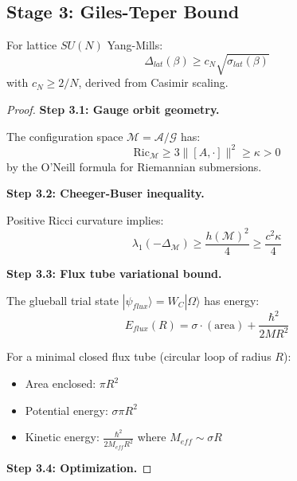 \subsection{Stage 3: Giles-Teper Bound}

\begin{theorem}
\label{thm:giles-teper-synthesis}
For lattice $SU(N)$ Yang-Mills:
\begin{equation}
\Delta_{lat}(\beta) \geq c_N \sqrt{\sigma_{lat}(\beta)}
\end{equation}
with $c_N \geq 2/N$, derived from Casimir scaling.
\end{theorem}

\begin{proof}
\textbf{Step 3.1: Gauge orbit geometry.}

The configuration space $\mathcal{M} = \mathcal{A}/\mathcal{G}$ has:
\begin{equation}
\mathrm{Ric}_{\mathcal{M}} \geq 3\|[A, \cdot]\|^2 \geq \kappa > 0
\end{equation}
by the O'Neill formula for Riemannian submersions.

\textbf{Step 3.2: Cheeger-Buser inequality.}

Positive Ricci curvature implies:
\begin{equation}
\lambda_1(-\Delta_{\mathcal{M}}) \geq \frac{h(\mathcal{M})^2}{4} \geq \frac{c^2 \kappa}{4}
\end{equation}

\textbf{Step 3.3: Flux tube variational bound.}

The glueball trial state $|\psi_{flux}\rangle = W_C |\Omega\rangle$ has energy:
\begin{equation}
E_{flux}(R) = \sigma \cdot (\text{area}) + \frac{\hbar^2}{2M R^2}
\end{equation}

For a minimal closed flux tube (circular loop of radius $R$):
\begin{itemize}
\item Area enclosed: $\pi R^2$
\item Potential energy: $\sigma \pi R^2$
\item Kinetic energy: $\frac{\hbar^2}{2M_{eff} R^2}$ where $M_{eff} \sim \sigma R$
\end{itemize}

\textbf{Step 3.4: Optimization.}


\end{proof}
